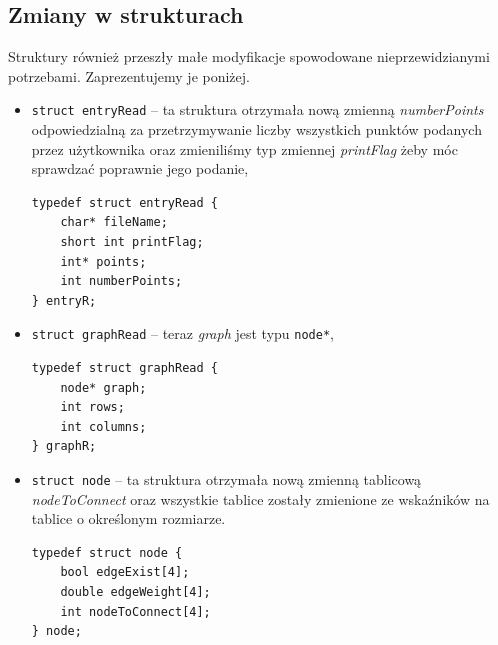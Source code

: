 \documentclass[10pt, a4paper]{report}
\begin{document}
    \subsection{Zmiany w strukturach}
    Struktury również przeszły małe modyfikacje spowodowane nieprzewidzianymi potrzebami. Zaprezentujemy je poniżej.
    \begin{itemize}
        \item \texttt{struct entryRead} -- ta struktura otrzymała nową zmienną \textit{numberPoints} odpowiedzialną za przetrzymywanie liczby
        wszystkich punktów podanych przez użytkownika oraz zmieniliśmy typ zmiennej \textit{printFlag} żeby móc sprawdzać poprawnie jego podanie,
        \begin{lstlisting}
typedef struct entryRead {
    char* fileName;
    short int printFlag;
    int* points;
    int numberPoints;
} entryR;
        \end{lstlisting}
        \item \texttt{struct graphRead} -- teraz \textit{graph} jest typu \texttt{node*},
        \begin{lstlisting}
typedef struct graphRead {
    node* graph;
    int rows;
    int columns;
} graphR;
        \end{lstlisting}
        \item \texttt{struct node} -- ta struktura otrzymała nową zmienną tablicową \textit{nodeToConnect} oraz wszystkie tablice zostały zmienione ze wskaźników na tablice o określonym rozmiarze. 
        \begin{lstlisting}
typedef struct node {
    bool edgeExist[4]; 
    double edgeWeight[4]; 
    int nodeToConnect[4];
} node;
        \end{lstlisting}        
    \end{itemize}
\end{document}
